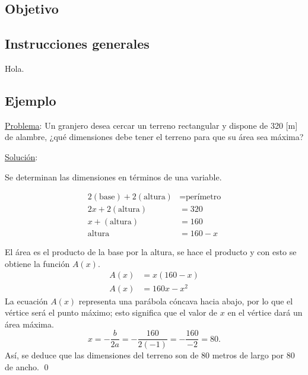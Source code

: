 \documentclass[
  titulo=Tarea,
  subtitulo=Función cuadrática,
  curso=Segundo medio
]{srs3}
\begin{document}
\subsection*{Objetivo}

\subsection*{Instrucciones generales}
Hola.

\subsection*{Ejemplo}

\underline{Problema}: Un granjero desea cercar un terreno rectangular y dispone de
320 [m] de alambre, ¿qué dimensiones debe tener el terreno para que
su área sea máxima?

\underline{Solución}:

Se determinan las dimensiones en términos de una variable.
\begin{columnas}[0.6]
\begin{align*}
  2\left(\text{base}\right) + 2\left(\text{altura}\right) &= \text{perímetro} \\
  2x + 2\left(\text{altura}\right) &= 320 \\
  x + \left(\text{altura}\right) &= 160 \\
  \text{altura} &= 160 - x
\end{align*}
\siguiente
{}
\end{columnas}
El área es el producto de la base por la altura, se hace el producto y con
esto se obtiene la función \(A\left(x\right)\).
\begin{align*}
    A\left(x\right) &= x(160-x) \\
    A\left(x\right) &= 160x - x^2
\end{align*}
La ecuación \(A\left(x\right)\) representa una parábola cóncava hacia
abajo, por lo que el vértice será el punto máximo; esto significa que
el valor de \(x\) en el vértice dará un área máxima.
\begin{equation*}
x = -\dfrac{b}{2a} = - \dfrac{160}{2\left(-1\right)} = -\dfrac{160}{-2} = 80.
\end{equation*}
Así, se deduce que las dimensiones del terreno son de 80 metros
de largo por 80 de ancho. \qed
\end{document}
